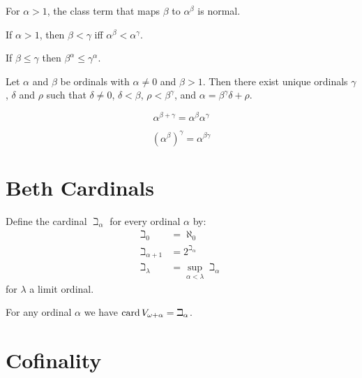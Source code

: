 \begin{theorem}
    For $\alpha > 1$, the class term that maps $\beta$ to $\alpha^\beta$ is normal.
\end{theorem}

\begin{theorem}
    If $\alpha > 1$, then $\beta < \gamma$ iff $\alpha^\beta < \alpha^\gamma$.
\end{theorem}

\begin{theorem}
    If $\beta \leq \gamma$ then $\beta^\alpha \leq \gamma^\alpha$.
\end{theorem}

\begin{theorem}
    Let $\alpha$ and $\beta$ be ordinals with $\alpha \neq 0$
    and $\beta > 1$. Then there exist unique ordinals $\gamma$,
    $\delta$ and $\rho$ such that $\delta \neq 0$, $\delta < \beta$,
    $\rho < \beta^\gamma$, and $\alpha = \beta^\gamma \delta + \rho$.
\end{theorem}

\begin{theorem}
    \[ \alpha^{\beta + \gamma} = \alpha^\beta \alpha^\gamma \]
\end{theorem}

\begin{theorem}
    \[ (\alpha^\beta)^\gamma = \alpha^{\beta \gamma} \]
\end{theorem}

\section{Beth Cardinals}

\begin{definition}
    Define the cardinal $\beth_\alpha$ for every ordinal $\alpha$ by:
    \begin{align*}
        \beth_0 & = \aleph_0 \\
        \beth_{\alpha + 1} & = 2^{\beth_\alpha} \\
        \beth_\lambda & = \sup_{\alpha < \lambda} \beth_\alpha
    \end{align*}
    for $\lambda$ a limit ordinal.
\end{definition}

\begin{lemma}
    For any ordinal $\alpha$ we have $\operatorname{card} V_{\omega + \alpha} = \beth_\alpha$.
\end{lemma}

\section{Cofinality}

